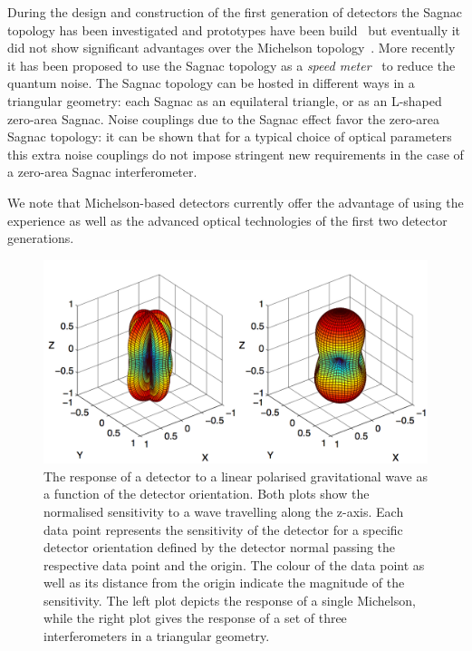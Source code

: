 During the design and construction of the first generation of detectors 
the Sagnac topology has been investigated and prototypes have been
build~\cite{sun96} but eventually it did not show significant advantages over the Michelson 
topology~\cite{Mizuno97}. More recently it has been proposed to use the Sagnac topology 
as a \emph{speed meter}~\cite{Chen03} to reduce the quantum noise.
The Sagnac topology can be hosted in different ways in a triangular
geometry: each Sagnac as an equilateral triangle, or as an {\sf L}-shaped
zero-area Sagnac. Noise couplings due to the Sagnac effect favor the 
zero-area Sagnac topology: it can be shown that for a typical
choice of optical parameters this extra noise couplings do not
impose stringent new requirements in the case of a zero-area Sagnac
interferometer.

We note that Michelson-based detectors currently offer the 
advantage of using the experience as well as the 
advanced optical technologies of the first two detector generations.


\begin{figure}[t]
\begin{center}
\includegraphics[width=\textwidth]{ap_mi.png}
\caption{
The response of a detector to a linear polarised gravitational wave
as a function of the detector orientation. Both plots show the normalised sensitivity
to a wave travelling along the z-axis. Each data point represents the sensitivity of the
detector for a specific detector orientation defined by the detector normal
passing the respective data point and the origin. The colour
of the data point as well as its distance from the origin indicate the magnitude of the
sensitivity. The left plot depicts the response of a single Michelson, while the right plot
gives the response of a set of three interferometers in a  triangular geometry.
}
\label{fig:triangleAP}
\end{center}
\end{figure}


